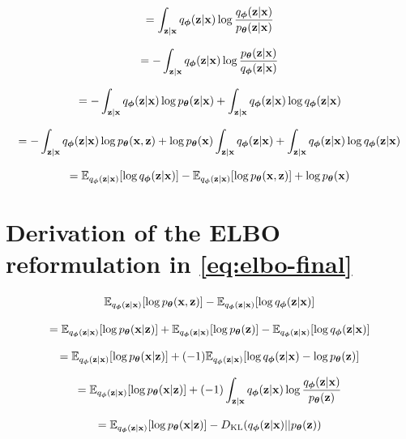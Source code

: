 \documentclass[11pt]{article}
\theoremstyle{definition}
\begin{document}
	\begin{equation}
		= \int_{\bz|\bx} \qPhi(\bz|\bx) \log \frac{\qPhi(\bz|\bx)}{\pT(\bz|\bx)}
	\end{equation}
	
	\begin{equation}
		= - \int_{\bz|\bx} \qPhi(\bz|\bx) \log \frac{\pT(\bz|\bx)}{\qPhi(\bz|\bx)}
	\end{equation}
	
	\begin{equation}
	= - \int_{\bz|\bx} \qPhi(\bz|\bx) \log \pT(\bz|\bx) + \int_{\bz|\bx} \qPhi(\bz|\bx) \log \qPhi(\bz|\bx)
	\end{equation}
	
	\begin{equation}
	= - \int_{\bz|\bx} \qPhi(\bz|\bx) \log \pT(\bx, \bz) + \log \pT(\bx)\int_{\bz|\bx} \qPhi(\bz|\bx) + \int_{\bz|\bx} \qPhi(\bz|\bx) \log \qPhi(\bz|\bx)
	\end{equation}
	
	\begin{equation}
	= \mathbb{E}_{\qPhi(\bz|\bx)}[\log \qPhi(\bz|\bx)] - \mathbb{E}_{\qPhi(\bz|\bx)}[\log \pT(\bx,\bz)] + \log\pT(\bx)
	\end{equation}
	
	\section{Derivation of the ELBO reformulation in \autoref{eq:elbo-final}}
	\label{appendix:elbo-reform}
	
	\begin{equation}
		\mathbb{E}_{\qPhi(\bz|\bx)}[\log \pT(\bx,\bz)] - \mathbb{E}_{\qPhi(\bz|\bx)}[\log \qPhi(\bz|\bx)]
	\end{equation}
	
	\begin{equation}
		= \mathbb{E}_{\qPhi(\bz|\bx)}[\log \pT(\bx|\bz)] + \mathbb{E}_{\qPhi(\bz|\bx)}[\log \pT(\bz)] - \mathbb{E}_{\qPhi(\bz|\bx)}[\log \qPhi(\bz|\bx)]
	\end{equation}
	
	\begin{equation}
	= \mathbb{E}_{\qPhi(\bz|\bx)}[\log \pT(\bx|\bz)] + (-1) \mathbb{E}_{\qPhi(\bz|\bx)}[\log \qPhi(\bz|\bx) - \log \pT(\bz)]
	\end{equation}
	
	\begin{equation}
	= \mathbb{E}_{\qPhi(\bz|\bx)}[\log \pT(\bx|\bz)] + (-1) \int_{\bz|\bx} \qPhi(\bz|\bx)\log \frac{\qPhi(\bz|\bx)}{\pT(\bz)}
	\end{equation}
	
	\begin{equation}
	= \mathbb{E}_{\qPhi(\bz|\bx)}[\log \pT(\bx|\bz)] - D_{\text{KL}}(\qPhi(\bz|\bx)||\pT(\bz))
	\end{equation}
\end{document}
